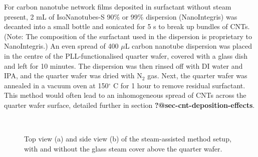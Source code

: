 \documentclass[
  a4paper,
]{scrbook}
\begin{document}
For carbon nanotube network films deposited in surfactant without steam
present, 2 mL of IsoNanotubes-S 90\% or 99\% dispersion (NanoIntegris)
was decanted into a small bottle and sonicated for 5 s to break up
bundles of CNTs. (Note: The composition of the surfactant used in the
dispersion is proprietary to NanoIntegris.) An even spread of 400
\(\mu\)L carbon nanotube dispersion was placed in the centre of the
PLL-functionalised quarter wafer, covered with a glass dish and left for
10 minutes. The dispersion was then rinsed off with DI water and IPA,
and the quarter wafer was dried with N\(_2\) gas. Next, the quarter
wafer was annealed in a vacuum oven at 150\(^\circ\) C for 1 hour to
remove residual surfactant. This method would often lead to an
inhomogeneous spread of CNTs across the quarter wafer surface, detailed
further in section \textbf{?@sec-cnt-deposition-effects}.

\begin{figure}

\begin{minipage}[t]{0.47\linewidth}

{\centering 


}

\subcaption{\label{fig-steaming-method-top}}
\end{minipage}%
%
\begin{minipage}[t]{0.05\linewidth}

{\centering 

~

}

\end{minipage}%
%
\begin{minipage}[t]{0.47\linewidth}

{\centering 


}

\subcaption{\label{fig-steaming-method-side}}
\end{minipage}%

\caption{\label{fig-steaming-method}Top view (a) and side view (b) of
the steam-assisted method setup, with and without the glass steam cover
above the quarter wafer.}

\end{figure}
\end{document}
